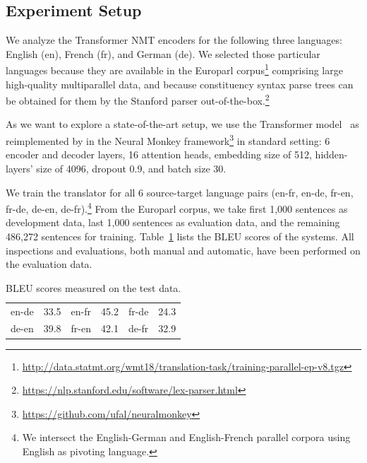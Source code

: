 \documentclass[11pt,a4paper]{article}
\newcommand\footurl[1]{\footnote{\url{#1}}}
\def\DM#1{{\color{red}DM: \it #1}}
\def\JL#1{{\color{magenta}JL: \it #1}}
\def\JL#1{}
\def\DM#1{}
\begin{document}
 

\subsection{Experiment Setup}
We analyze the Transformer NMT encoders for the following three languages: English (en), French (fr), and German (de). We selected those particular languages because they are available in the Europarl corpus\footnote{\url{http://data.statmt.org/wmt18/translation-task/training-parallel-ep-v8.tgz}} \cite{europarl} comprising large high-quality multiparallel data, and because constituency syntax parse trees can be obtained for them by the Stanford parser \citep{stanfordparser} out-of-the-box.\footurl{https://nlp.stanford.edu/software/lex-parser.html}

As we
want to explore
a state-of-the-art setup, we use the Transformer 
model~\cite{vaswani2017attention}
as reimplemented by \citet{neuralmonkey:2018} in the Neural Monkey framework\footnote{\url{https://github.com/ufal/neuralmonkey}} in standard setting:
6 encoder and decoder layers, 16 attention heads, embedding size of 512, hidden-layers' size of 4096, dropout 0.9, and batch size 30.

We train the translator for all 6 source-target language pairs (en-fr, en-de, fr-en, fr-de, de-en, de-fr).\footnote{We
intersect the
English-German and English-French parallel corpora using English as pivoting language.}
From the Europarl corpus, we take first 1,000 sentences as development data, last 1,000 sentences as evaluation data, and the remaining 486,272 sentences for training. Table~\ref{tab:bleu-scores} lists the BLEU scores of the systems.
All inspections and evaluations, both manual and automatic, have been performed on the evaluation data.

\begin{table}
    \centering
    \begin{tabular}{rl|rl|rl}
         en-de & 33.5 & en-fr & 45.2 & fr-de & 24.3 \\
         de-en & 39.8 & fr-en & 42.1 & de-fr & 32.9 \\
    \end{tabular}
    \caption{BLEU scores measured on the test data.}
    \label{tab:bleu-scores}
\end{table}
\end{document}
